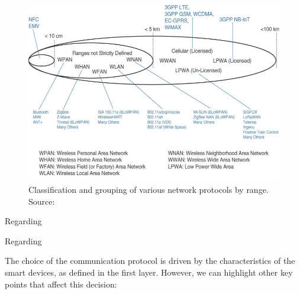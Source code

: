 \begin{figure}[H]
    \centering
    \includegraphics[width=0.85\linewidth]{images/communication-protocols.png}
    \caption[Classification and grouping of various network protocols by range.]{ Classification and grouping of various network protocols by range. Source: \cite{10.5555/3161403}}
    \label{fig:communication-protocols}
\end{figure}


Regarding 


Regarding 




The choice of the communication protocol is driven by the characteristics of the smart devices, as defined in the first layer. However, we can highlight other key points that affect this decision:

